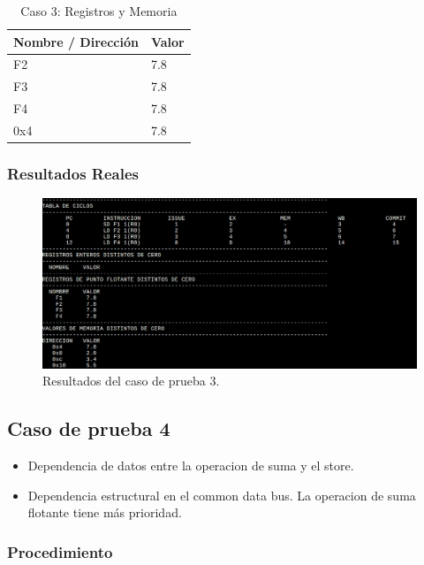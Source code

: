 \documentclass[a4paper]{article}
\begin{document}
	\begin{table}[H]
		\centering
		\caption*{Caso 3: Registros y Memoria}
		\begin{tabular}{|l|l|}
			\hline
			\textbf{Nombre / Dirección} & \textbf{Valor} \\ \hline
			F2                          & 7.8            \\ \hline
			F3                          & 7.8            \\ \hline
			F4                          & 7.8            \\ \hline
			0x4                         & 7.8            \\ \hline
		\end{tabular}
	\end{table}

	\subsubsection*{Resultados Reales}

	\begin{figure}[H]
	\centering
	\includegraphics[width=1\textwidth]{figures/test3.png}
	\caption{\label{fig:bloques}Resultados del caso de prueba 3.}
	\end{figure}


	\subsection*{Caso de prueba 4}

	\begin{itemize}
		\item Dependencia de datos entre la operacion de suma y el store. 
		\item Dependencia estructural en el common data bus. La operacion de suma flotante tiene más prioridad. 
	\end{itemize}

	\subsubsection*{Procedimiento}
\end{document}
